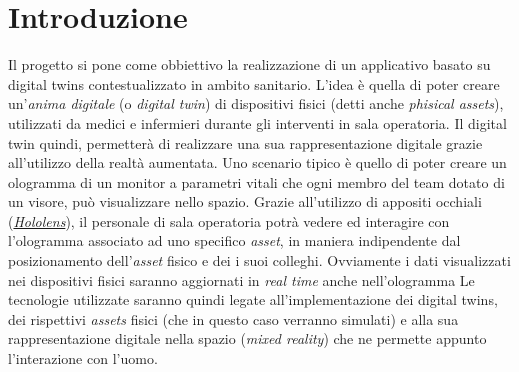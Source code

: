 \chapter{Introduzione}
Il progetto si pone come obbiettivo la realizzazione di un applicativo basato su digital twins contestualizzato in ambito sanitario. L'idea è quella di poter creare un'\textit{anima digitale} (o \textit{digital twin}) di dispositivi fisici (detti anche \textit{phisical assets}), utilizzati da medici e infermieri durante gli interventi in sala operatoria. Il digital twin quindi, permetterà di realizzare una sua rappresentazione digitale grazie all'utilizzo della realtà aumentata. \newline \newline Uno scenario tipico è quello di poter creare un ologramma di un monitor a parametri vitali che ogni membro del team dotato di un visore, può visualizzare nello spazio. Grazie all'utilizzo di appositi occhiali (\href{https://www.microsoft.com/it-it/hololens}{\textit{Hololens}}), il personale di sala operatoria potrà vedere ed interagire con l'ologramma associato ad uno specifico \textit{asset}, in maniera indipendente dal posizionamento dell'\textit{asset} fisico e dei i suoi colleghi. Ovviamente i dati visualizzati nei dispositivi fisici saranno aggiornati in \textit{real time} anche nell'ologramma
\newline \newline Le tecnologie utilizzate saranno quindi legate all'implementazione dei digital twins, dei rispettivi \textit{assets} fisici (che in questo caso verranno simulati) e alla sua rappresentazione digitale nella spazio (\textit{mixed reality}) che ne permette appunto l'interazione con l'uomo.